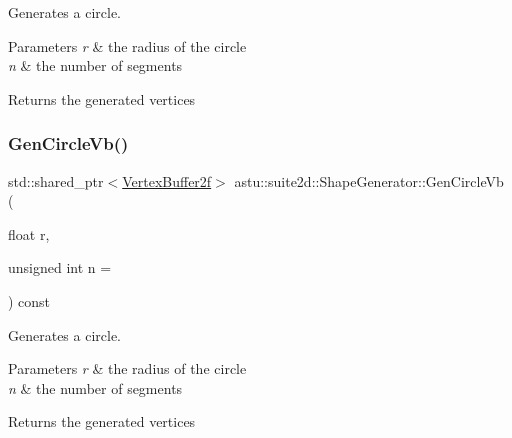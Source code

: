 Generates a circle.


\begin{DoxyParams}{Parameters}
{\em r} & the radius of the circle \\
\hline
{\em n} & the number of segments \\
\hline
\end{DoxyParams}
\begin{DoxyReturn}{Returns}
the generated vertices 
\end{DoxyReturn}
\mbox{\label{classastu_1_1suite2d_1_1ShapeGenerator_a3b9a8e17a85ae7ba4ac40c40de8074d6}} 
\subsubsection{\texorpdfstring{Gen\+Circle\+Vb()}{GenCircleVb()}}
{\footnotesize\ttfamily std\+::shared\+\_\+ptr$<$\hyperlink{group__gfx__group_ga081cf45a441eef100dfbb1e0f64c3826}{Vertex\+Buffer2f}$>$ astu\+::suite2d\+::\+Shape\+Generator\+::\+Gen\+Circle\+Vb (\begin{DoxyParamCaption}\item[{float}]{r,  }\item[{unsigned int}]{n = {} }\end{DoxyParamCaption}) const\hspace{0.3cm}{\ttfamily [inline]}}

Generates a circle.


\begin{DoxyParams}{Parameters}
{\em r} & the radius of the circle \\
\hline
{\em n} & the number of segments \\
\hline
\end{DoxyParams}
\begin{DoxyReturn}{Returns}
the generated vertices 
\end{DoxyReturn}
\mbox{\label{classastu_1_1suite2d_1_1ShapeGenerator_a6307265bf97cd225a00ddfffd26cba5f}} 

